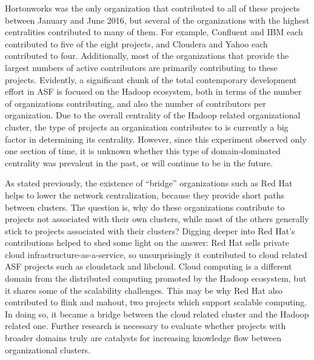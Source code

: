 Hortonworks was the only organization that contributed to all of these projects between January and June 2016, but several of the organizations with the highest centralities contributed to many of them. For example, Confluent and IBM each contributed to five of the eight projects, and Cloudera and Yahoo each contributed to four. Additionally, most of the organizations that provide the largest numbers of active contributors are primarily contributing to these projects. Evidently, a significant chunk of the total contemporary development effort in ASF is focused on the Hadoop ecosystem, both in terms of the number of organizations contributing, and also the number of contributors per organization. Due to the overall centrality of the Hadoop related organizational cluster, the type of projects an organization contributes to is currently a big factor in determining its centrality. However, since this experiment observed only one section of time, it is unknown whether this type of domain-dominated centrality was prevalent in the past, or will continue to be in the future.

As stated previously, the existence of ``bridge'' organizations such as Red Hat helps to lower the network centralization, because they provide short paths between clusters. The question is, why do these organizations contribute to projects not associated with their own clusters, while most of the others generally stick to projects associated with their clusters? Digging deeper into Red Hat's contributions helped to shed some light on the answer: Red Hat sells private cloud infrastructure-as-a-service\cite{redhat}, so unsurprisingly it contributed to cloud related ASF projects such as cloudstack and libcloud. Cloud computing is a different domain from the distributed computing promoted by the Hadoop ecosystem, but it shares some of the scalability challenges. This may be why Red Hat also contributed to flink and mahout, two projects which support scalable computing. In doing so, it became a bridge between the cloud related cluster and the Hadoop related one. Further research is necessary to evaluate whether projects with broader domains truly are catalysts for increasing knowledge flow between organizational clusters. %


